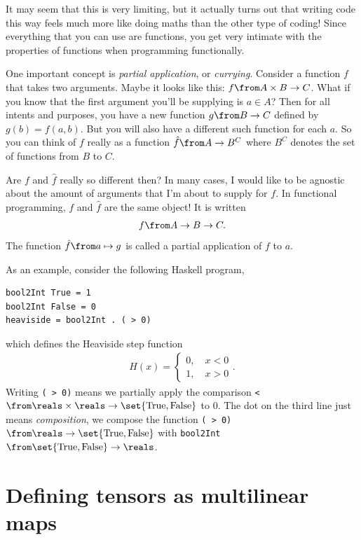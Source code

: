 It may seem that this is very limiting, but it actually turns out that writing code this way feels much more like doing maths than the other type of coding!
Since everything that you can use are functions, you get very intimate with the properties of functions when programming functionally.

One important concept is \emph{partial application}, or \emph{currying}.
Consider a function $f$ that takes two arguments.
Maybe it looks like this: $f \from A \times B \to C$.
What if you know that the first argument you'll be supplying is $a \in A$?
Then for all intents and purposes, you have a new function $g \from B \to C$ defined by $g(b) = f(a, b)$.
But you will also have a different such function for each $a$.
So you can think of $f$ really as a function $\hat f\from A \to B^C$ where $B^C$ denotes the set of functions from $B$ to $C$.

Are $f$ and $\hat f$ really so different then?
In many cases, I would like to be agnostic about the amount of arguments that I'm about to supply for $f$.
In functional programming, $f$ and $\hat f$ are the same object!
It is written
\begin{align*}
	f \from A \to B \to C.
\end{align*}
The function $\hat f \from a \mapsto g$ is called a partial application of $f$ to $a$.

As an example, consider the following Haskell program,
\begin{verbatim}
bool2Int True = 1
bool2Int False = 0
heaviside = bool2Int . ( > 0)
\end{verbatim}
which defines the Heaviside step function
\begin{align*}
	H(x) =
	\begin{cases}
		0, \quad x < 0\\
		1, \quad x > 0
	\end{cases}.
\end{align*}
Writing \verb|( > 0)| means we partially apply the comparison \verb|<|$\from \reals \times \reals \to \set{\textrm{True}, \textrm{False}}$ to $0$.
The dot on the third line just means \emph{composition}, we compose the function \verb|( > 0)| $\from \reals \to \set{\textrm{True}, \textrm{False}}$ with \verb|bool2Int|$\from \set{\textrm{True}, \textrm{False}} \to \reals$.


\section{Defining tensors as multilinear maps}%
\label{sec:defining_tensors_as_multilinear_maps}

